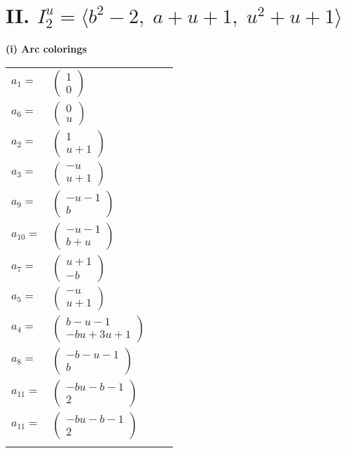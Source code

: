 \documentclass[1p]{elsarticle_modified}
\theoremstyle{definition}
\begin{document}
\centering \section*{II. $I^u_{2}= \langle b^2-2,\;a+u+1,\;u^2+u+1 \rangle$}
\flushleft \textbf{(i) Arc colorings}\\
\begin{tabular}{m{7pt} m{180pt} m{7pt} m{180pt} }
\flushright $a_{1}=$&$\begin{pmatrix}1\\0\end{pmatrix}$ \\
\flushright $a_{6}=$&$\begin{pmatrix}0\\u\end{pmatrix}$ \\
\flushright $a_{2}=$&$\begin{pmatrix}1\\u+1\end{pmatrix}$ \\
\flushright $a_{3}=$&$\begin{pmatrix}- u\\u+1\end{pmatrix}$ \\
\flushright $a_{9}=$&$\begin{pmatrix}- u-1\\b\end{pmatrix}$ \\
\flushright $a_{10}=$&$\begin{pmatrix}- u-1\\b+u\end{pmatrix}$ \\
\flushright $a_{7}=$&$\begin{pmatrix}u+1\\- b\end{pmatrix}$ \\
\flushright $a_{5}=$&$\begin{pmatrix}- u\\u+1\end{pmatrix}$ \\
\flushright $a_{4}=$&$\begin{pmatrix}b- u-1\\- b u+3 u+1\end{pmatrix}$ \\
\flushright $a_{8}=$&$\begin{pmatrix}- b- u-1\\b\end{pmatrix}$ \\
\flushright $a_{11}=$&$\begin{pmatrix}- b u- b-1\\2\end{pmatrix}$\\ \flushright $a_{11}=$&$\begin{pmatrix}- b u- b-1\\2\end{pmatrix}$\\&\end{tabular}
\end{document}
